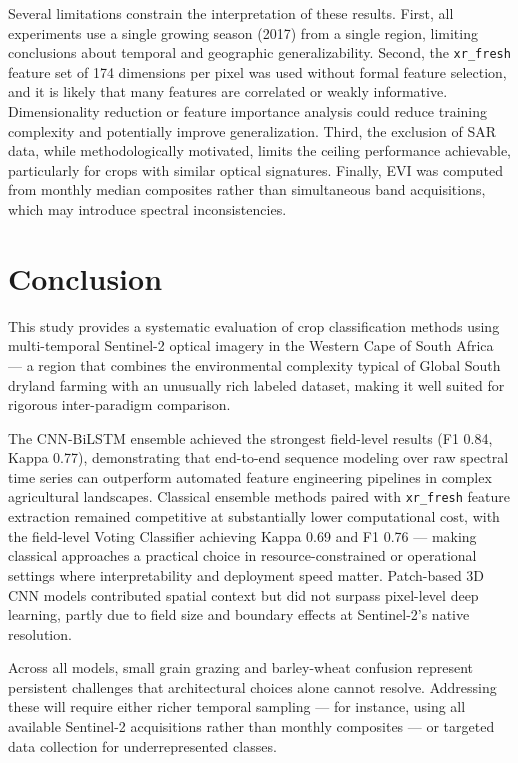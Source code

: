 \documentclass[pdflatex,sn-mathphys]{sn-jnl} %
\begin{document}
Several limitations constrain the interpretation of these results. First, all
experiments use a single growing season (2017) from a single region, limiting
conclusions about temporal and geographic generalizability. Second, the
\texttt{xr\_fresh} feature set of 174 dimensions per pixel was used without
formal feature selection, and it is likely that many features are correlated or
weakly informative. Dimensionality reduction or feature importance analysis
could reduce training complexity and potentially improve generalization. Third,
the exclusion of SAR data, while methodologically motivated, limits the ceiling
performance achievable, particularly for crops with similar optical signatures.
Finally, EVI was computed from monthly median composites rather than
simultaneous band acquisitions, which may introduce spectral inconsistencies.

\section{Conclusion}

This study provides a systematic evaluation of crop classification methods using multi-temporal Sentinel-2 optical imagery in the Western Cape of South Africa — a region that combines the environmental complexity typical of Global South dryland farming with an unusually rich labeled dataset, making it well suited for rigorous inter-paradigm comparison.

The CNN-BiLSTM ensemble achieved the strongest field-level results (F1 0.84, Kappa 0.77), demonstrating that end-to-end sequence modeling over raw spectral time series can outperform automated feature engineering pipelines in complex agricultural landscapes. Classical ensemble methods paired with \texttt{xr\_fresh} feature extraction remained competitive at substantially lower computational cost, with the field-level Voting Classifier achieving Kappa 0.69 and F1 0.76 — making classical approaches a practical choice in resource-constrained or operational settings where interpretability and deployment speed matter. Patch-based 3D CNN models contributed spatial context but did not surpass pixel-level deep learning, partly due to field size and boundary effects at Sentinel-2's native resolution.

Across all models, small grain grazing and barley-wheat confusion represent persistent challenges that architectural choices alone cannot resolve. Addressing these will require either richer temporal sampling — for instance, using all available Sentinel-2 acquisitions rather than monthly composites — or targeted data collection for underrepresented classes.
\end{document}
